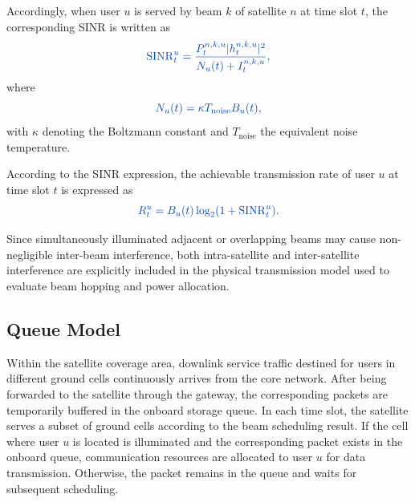 \documentclass[journal]{IEEEtran}
\newcommand{\revbegin}[1]{\color{revisionblue}\ignorespaces}
\newcommand{\revend}[1]{\color{black}\ignorespaces}
\begin{document}
Accordingly, when user $u$ is served by beam $k$ of satellite $n$ at time slot $t$, the corresponding SINR is written as
\begin{equation}\color{revisionblue}
\mathrm{SINR}_t^u
=
\frac{
{P}_t^{n,k,u}|h_t^{n,k,u}|^2
}{
N_u(t)+I_t^{n,k,u}
},
\label{eq:sinr}
\end{equation}
where
\begin{equation}\color{revisionblue}
N_u(t)=\kappa T_{\mathrm{noise}}B_u(t),
\end{equation}
\revbegin{}with $\kappa$ denoting the Boltzmann constant and $T_{\mathrm{noise}}$ the equivalent noise temperature.\revend{}

According to the SINR expression, the achievable transmission rate of user $u$ at time slot $t$ is expressed as
\begin{equation}\color{revisionblue}
R_t^u
=
B_u(t)\log_2(1+\mathrm{SINR}_t^u).
\label{eq:rate}
\end{equation}

\revbegin{}Since simultaneously illuminated adjacent or overlapping beams may cause non-negligible inter-beam interference, both intra-satellite and inter-satellite interference are explicitly included in the physical transmission model used to evaluate beam hopping and power allocation.\revend{}

\subsection{Queue Model}
\label{subsec:queue-model}
Within the satellite coverage area, downlink service traffic destined for users in different ground cells continuously arrives from the core network. After being forwarded to the satellite through the gateway, the corresponding packets are temporarily buffered in the onboard storage queue. In each time slot, the satellite serves a subset of ground cells according to the beam scheduling result. If the cell where user $u$ is located is illuminated and the corresponding packet exists in the onboard queue, communication resources are allocated to user $u$ for data transmission. Otherwise, the packet remains in the queue and waits for subsequent scheduling.
\end{document}
